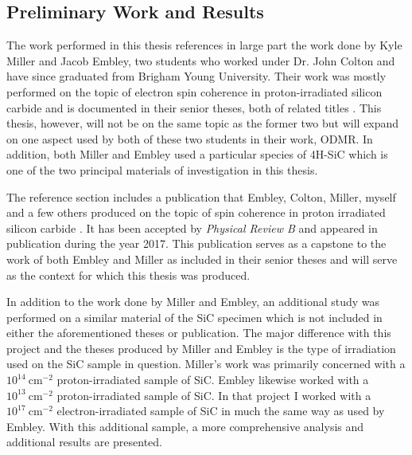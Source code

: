 \documentclass[oneside]{BYUPhys}
\begin{document}
\subsection{Preliminary Work and Results}

The work performed in this thesis references in large part the work done by Kyle Miller and Jacob Embley, two students who worked under Dr. John Colton and have since graduated from Brigham Young University. Their work was mostly performed on the topic of electron spin coherence in proton-irradiated silicon carbide and is documented in their senior theses, both of related titles \cite{RefWorks:doc:5892989ee4b0499fa95c51c8} \cite{RefWorks:doc:5892912ae4b0dec22aee3993}. This thesis, however, will not be on the same topic as the former two but will expand on one aspect used by both of these two students in their work, ODMR. In addition, both Miller and Embley used a particular species of 4H-SiC which is one of the two principal materials of investigation in this thesis.

The reference section includes a publication that Embley, Colton, Miller, myself and a few others produced on the topic of spin coherence in proton irradiated silicon carbide \cite{RefWorks:doc:58929128e4b0499fa95c5064}. It has been accepted by \textit{Physical Review B} and appeared in publication during the year 2017. This publication serves as a capstone to the work of both Embley and Miller as included in their senior theses and will serve as the context for which this thesis was produced.

In addition to the work done by Miller and Embley, an additional study was performed on a similar material of the SiC specimen which is not included in either the aforementioned theses or publication. The major difference with this project and the theses produced by Miller and Embley is the type of irradiation used on the SiC sample in question. Miller's work was primarily concerned with a $10^{14}~\text{cm}^{-2}$ proton-irradiated sample of SiC. Embley likewise worked with a $10^{13}~\text{cm}^{-2}$ proton-irradiated sample of SiC. In that project I worked with a $10^{17}~\text{cm}^{-2}$ electron-irradiated sample of SiC in much the same way as used by Embley. With this additional sample, a more comprehensive analysis and additional results are presented.
\end{document}
